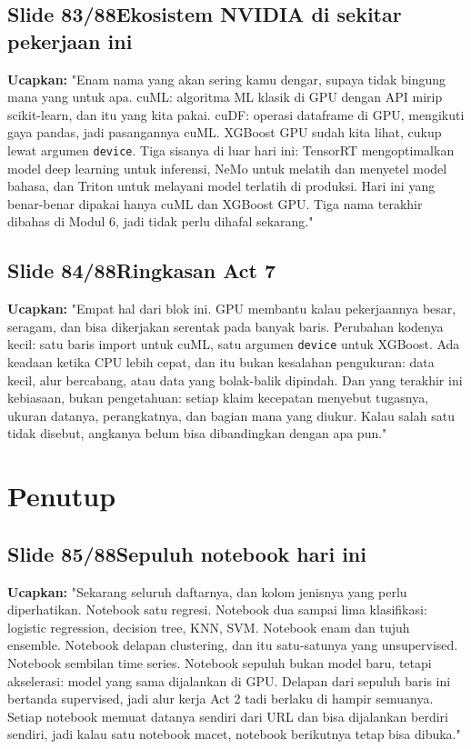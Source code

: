 \documentclass[11pt]{article}
\renewcommand{\framebox}[1]{\colorbox{acc!15}{\textcolor{acc}{\textbf{#1}}}}
\begin{document}
\subsection*{\framebox{Slide 83/88}\quad Ekosistem NVIDIA di sekitar pekerjaan ini}
\textbf{Ucapkan:} "Enam nama yang akan sering kamu dengar, supaya tidak bingung mana yang untuk apa. cuML: algoritma ML klasik di GPU dengan API mirip scikit-learn, dan itu yang kita pakai. cuDF: operasi dataframe di GPU, mengikuti gaya pandas, jadi pasangannya cuML. XGBoost GPU sudah kita lihat, cukup lewat argumen \texttt{device}. Tiga sisanya di luar hari ini: TensorRT mengoptimalkan model deep learning untuk inferensi, NeMo untuk melatih dan menyetel model bahasa, dan Triton untuk melayani model terlatih di produksi. Hari ini yang benar-benar dipakai hanya cuML dan XGBoost GPU. Tiga nama terakhir dibahas di Modul 6, jadi tidak perlu dihafal sekarang."\\[2pt]

\subsection*{\framebox{Slide 84/88}\quad Ringkasan Act 7}
\textbf{Ucapkan:} "Empat hal dari blok ini. GPU membantu kalau pekerjaannya besar, seragam, dan bisa dikerjakan serentak pada banyak baris. Perubahan kodenya kecil: satu baris import untuk cuML, satu argumen \texttt{device} untuk XGBoost. Ada keadaan ketika CPU lebih cepat, dan itu bukan kesalahan pengukuran: data kecil, alur bercabang, atau data yang bolak-balik dipindah. Dan yang terakhir ini kebiasaan, bukan pengetahuan: setiap klaim kecepatan menyebut tugasnya, ukuran datanya, perangkatnya, dan bagian mana yang diukur. Kalau salah satu tidak disebut, angkanya belum bisa dibandingkan dengan apa pun."\\[2pt]

\section{Penutup}

\subsection*{\framebox{Slide 85/88}\quad Sepuluh notebook hari ini}
\textbf{Ucapkan:} "Sekarang seluruh daftarnya, dan kolom jenisnya yang perlu diperhatikan. Notebook satu regresi. Notebook dua sampai lima klasifikasi: logistic regression, decision tree, KNN, SVM. Notebook enam dan tujuh ensemble. Notebook delapan clustering, dan itu satu-satunya yang unsupervised. Notebook sembilan time series. Notebook sepuluh bukan model baru, tetapi akselerasi: model yang sama dijalankan di GPU. Delapan dari sepuluh baris ini bertanda supervised, jadi alur kerja Act 2 tadi berlaku di hampir semuanya. Setiap notebook memuat datanya sendiri dari URL dan bisa dijalankan berdiri sendiri, jadi kalau satu notebook macet, notebook berikutnya tetap bisa dibuka."\\[2pt]
\end{document}
